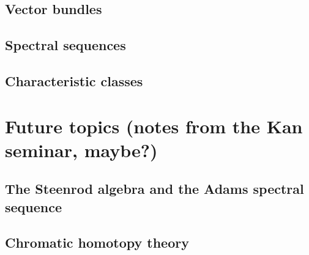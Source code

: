 \documentclass[a4paper]{extbook}
\begin{document}
\chapter{Vector bundles}









\chapter{Spectral sequences}











\chapter{Characteristic classes}






\part{Future topics (notes from the Kan seminar, maybe?)}

\chapter{The Steenrod algebra and the Adams spectral sequence}

\chapter{Chromatic homotopy theory}

\backmatter



\end{document}
